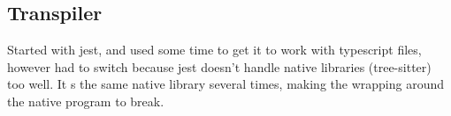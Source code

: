 \subsection{Transpiler}\label{subsec:testing-transpiler}

Started with jest, and used some time to get it to work with typescript files, however had to switch because jest doesn't handle native libraries (tree-sitter) too well.
It s the same native library several times, making the wrapping around the native program to break.